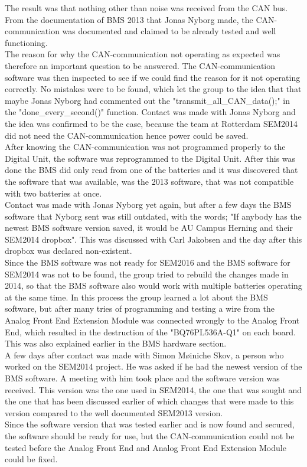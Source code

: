 The result was that nothing other than noise was received from the CAN bus.
From the documentation of BMS 2013 \cite{BMSDocumentation} that Jonas Nyborg made, the CAN-communication was documented and claimed to be already tested and well functioning.\\
The reason for why the CAN-communication not operating as expected was therefore an important question to be answered. The CAN-communication software was then inspected to see if we could find the reason for it not operating correctly. No mistakes were to be found, which let the group to the idea that that maybe Jonas Nyborg had commented out the "transmit\_all\_CAN\_data();" in the "done\_every\_second()" function. Contact was made with Jonas Nyborg and the idea was confirmed to be the case, because the team at Rotterdam SEM2014 did not need the CAN-communication hence power could be saved.\\
After knowing the CAN-communication was not programmed properly to the Digital Unit, the software was reprogrammed to the Digital Unit. After this was done the BMS did only read from one of the batteries and it was discovered that the software that was available, was the 2013 software, that was not compatible with two batteries at once.\\
Contact was made with Jonas Nyborg yet again, but after a few days the BMS software that Nyborg sent was still outdated, with the words; "If anybody has the newest BMS software version saved, it would be AU Campus Herning and their SEM2014 dropbox". This was discussed with Carl Jakobsen and the day after this dropbox was declared non-existent.\\
Since the BMS software was not ready for SEM2016 and the BMS software for SEM2014 was not to be found, the group tried to rebuild the changes made in 2014, so that the BMS software also would work with multiple batteries operating at the same time. In this process the group learned a lot about the BMS software, but after many tries of programming and testing a wire from the Analog Front End Extension Module was connected wrongly to the Analog Front End, which resulted in the destruction of the "BQ76PL536A-Q1" \cite{BMSBattIC} on each board. This was also explained earlier in the BMS hardware section.\\
A few days after contact was made with Simon Møiniche Skov, a person who worked on the SEM2014 project. He was asked if he had the newest version of the BMS software. A meeting with him took place and the software version was received. This version was the one used in SEM2014, the one that was sought and the one that has been discussed earlier of which changes that were made to this version compared to the well documented SEM2013 version.\\
Since the software version that was tested earlier and is now found and secured, the software should be ready for use, but the CAN-communication could not be tested before the Analog Front End and Analog Front End Extension Module could be fixed.\\  